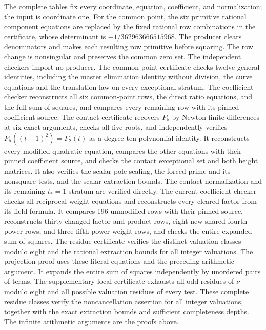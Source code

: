 \documentclass[11pt,a4paper]{article}
\begin{document}
The complete tables fix every coordinate, equation, coefficient, and
normalization; the input is coordinate one. For the common point,
the six primitive rational component equations are replaced by the
fixed rational row combinations in the certificate, whose determinant
is $-1/362963666515968$. The producer clears denominators and makes
each resulting row primitive before squaring. The row change is
nonsingular and preserves the common zero set.
The independent checkers import no producer. The common-point
certificate checks twelve general identities, including the master
elimination identity without division, the curve equations and the
translation law on every exceptional stratum. The coefficient checker
reconstructs all six common-point rows, the direct ratio equations,
and the full sum of squares, and compares every remaining row with
its pinned coefficient source. The contact certificate recovers $P_5$ by
Newton finite differences at six exact arguments, checks all five roots,
and independently verifies $P_5((t-1)^2)=F_2(t)$ as a degree-ten
polynomial identity. It reconstructs every modified quadratic equation,
compares the other equations with their pinned coefficient source, and
checks the contact exceptional set and both height matrices. It also verifies the scalar pole scaling, the forced prime and its nonsquare tests, and the scalar extraction bounds.
The contact normalization and its remaining $t_*=1$ stratum are
verified directly. The current coefficient checker checks all
reciprocal-weight equations and reconstructs every cleared factor
from its field formula. It compares 196 unmodified rows with their pinned source,
reconstructs thirty changed factor and product rows, eight new shared
fourth-power rows, and three fifth-power weight rows, and checks the
entire expanded sum of squares. The residue certificate
verifies the distinct valuation classes modulo eight and the rational
extraction bounds for all integer valuations.
The projection proof uses these literal equations and the preceding
arithmetic argument.
It expands the entire sum of squares independently by unordered
pairs of terms. The supplementary local certificate exhausts all
odd residues of $\nu$ modulo eight and all possible valuation residues
of every test. These complete residue classes verify the
noncancellation assertion for all integer valuations, together with
the exact extraction bounds and sufficient completeness depths.
The infinite arithmetic arguments are the proofs above.
\end{document}
